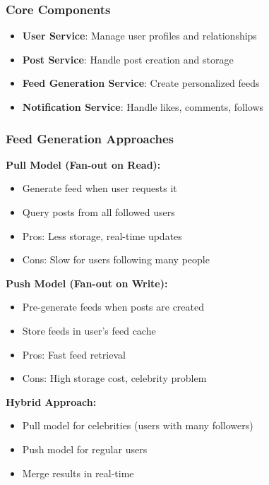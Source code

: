 \documentclass[10pt,a4paper]{article}
\begin{document}
\subsubsection{Core Components}
\begin{itemize}
\item \textbf{User Service}: Manage user profiles and relationships
\item \textbf{Post Service}: Handle post creation and storage
\item \textbf{Feed Generation Service}: Create personalized feeds
\item \textbf{Notification Service}: Handle likes, comments, follows
\end{itemize}

\subsubsection{Feed Generation Approaches}

\textbf{Pull Model (Fan-out on Read):}
\begin{itemize}
\item Generate feed when user requests it
\item Query posts from all followed users
\item Pros: Less storage, real-time updates
\item Cons: Slow for users following many people
\end{itemize}

\textbf{Push Model (Fan-out on Write):}
\begin{itemize}
\item Pre-generate feeds when posts are created
\item Store feeds in user's feed cache
\item Pros: Fast feed retrieval
\item Cons: High storage cost, celebrity problem
\end{itemize}

\textbf{Hybrid Approach:}
\begin{itemize}
\item Pull model for celebrities (users with many followers)
\item Push model for regular users
\item Merge results in real-time
\end{itemize}
\end{document}
